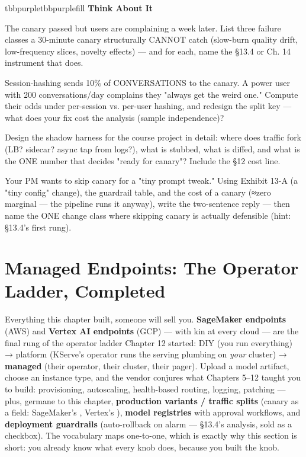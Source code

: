 \begin{calloutbox}{tbbpurple}{tbbpurplefill}
{\normalsize\bfseries\color{tbbpurple}Think About It}\par\vspace{3pt}
\begin{tbbitemize}
  \item The canary passed but users are complaining a week later. List three failure classes a 30-minute canary structurally CANNOT catch (slow-burn quality drift, low-frequency slices, novelty effects) — and for each, name the §13.4 or Ch. 14 instrument that does.
  \item Session-hashing sends 10\% of CONVERSATIONS to the canary. A power user with 200 conversations/day complains they "always get the weird one." Compute their odds under per-session vs. per-user hashing, and redesign the split key — what does your fix cost the analysis (sample independence)?
  \item Design the shadow harness for the course project in detail: where does traffic fork (LB? sidecar? async tap from logs?), what is stubbed, what is diffed, and what is the ONE number that decides "ready for canary"? Include the §12 cost line.
  \item Your PM wants to skip canary for a "tiny prompt tweak." Using Exhibit 13-A (a "tiny config" change), the guardrail table, and the cost of a canary (≈zero marginal — the pipeline runs it anyway), write the two-sentence reply — then name the ONE change class where skipping canary is actually defensible (hint: §13.4's first rung).
\end{tbbitemize}
\end{calloutbox}

\section{Managed Endpoints: The Operator Ladder, Completed}

Everything this chapter built, someone will sell you. \textbf{SageMaker endpoints} (AWS) and \textbf{Vertex AI endpoints} (GCP) — with kin at every cloud — are the final rung of the operator ladder Chapter 12 started: DIY (you run everything) → platform (KServe's operator runs the serving plumbing on \textit{your} cluster) → \textbf{managed} (their operator, their cluster, their pager). Upload a model artifact, choose an instance type, and the vendor conjures what Chapters 5–12 taught you to build: provisioning, autoscaling, health-based routing, logging, patching — plus, germane to this chapter, \textbf{production variants / traffic splits} (canary as a field: SageMaker's , Vertex's ), \textbf{model registries} with approval workflows, and \textbf{deployment guardrails} (auto-rollback on alarm — §13.4's analysis, sold as a checkbox). The vocabulary maps one-to-one, which is exactly why this section is short: you already know what every knob does, because you built the knob.

